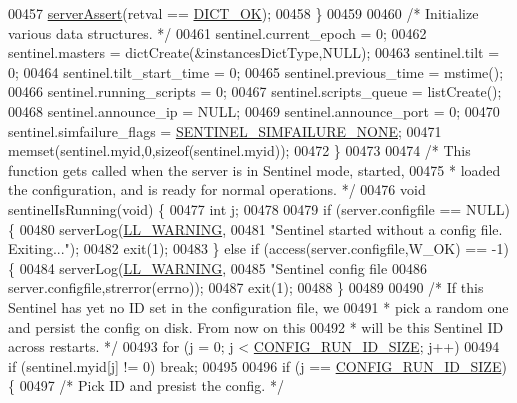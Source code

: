 \begin{DoxyCode}
00457         \hyperlink{server_8h_a88114b5169b4c382df6b56506285e56a}{serverAssert}(retval == \hyperlink{dict_8h_a2afecbeab8f7efbc183048f52f6d17e5}{DICT\_OK});
00458     \}
00459 
00460     \textcolor{comment}{/* Initialize various data structures. */}
00461     sentinel.current\_epoch = 0;
00462     sentinel.masters = dictCreate(&instancesDictType,NULL);
00463     sentinel.tilt = 0;
00464     sentinel.tilt\_start\_time = 0;
00465     sentinel.previous\_time = mstime();
00466     sentinel.running\_scripts = 0;
00467     sentinel.scripts\_queue = listCreate();
00468     sentinel.announce\_ip = NULL;
00469     sentinel.announce\_port = 0;
00470     sentinel.simfailure\_flags = \hyperlink{sentinel_8c_a045e4b70a9044e6e62c9cf6aafff8d3f}{SENTINEL\_SIMFAILURE\_NONE};
00471     memset(sentinel.myid,0,\textcolor{keyword}{sizeof}(sentinel.myid));
00472 \}
00473 
00474 \textcolor{comment}{/* This function gets called when the server is in Sentinel mode, started,}
00475 \textcolor{comment}{ * loaded the configuration, and is ready for normal operations. */}
00476 \textcolor{keywordtype}{void} sentinelIsRunning(\textcolor{keywordtype}{void}) \{
00477     \textcolor{keywordtype}{int} j;
00478 
00479     \textcolor{keywordflow}{if} (server.configfile == NULL) \{
00480         serverLog(\hyperlink{server_8h_a31229b9334bba7d6be2a72970967a14b}{LL\_WARNING},
00481             \textcolor{stringliteral}{"Sentinel started without a config file. Exiting..."});
00482         exit(1);
00483     \} \textcolor{keywordflow}{else} \textcolor{keywordflow}{if} (access(server.configfile,W\_OK) == -1) \{
00484         serverLog(\hyperlink{server_8h_a31229b9334bba7d6be2a72970967a14b}{LL\_WARNING},
00485             \textcolor{stringliteral}{"Sentinel config file %
00486             server.configfile,strerror(errno));
00487         exit(1);
00488     \}
00489 
00490     \textcolor{comment}{/* If this Sentinel has yet no ID set in the configuration file, we}
00491 \textcolor{comment}{     * pick a random one and persist the config on disk. From now on this}
00492 \textcolor{comment}{     * will be this Sentinel ID across restarts. */}
00493     \textcolor{keywordflow}{for} (j = 0; j < \hyperlink{server_8h_aba6794fa3ee28f85165eaed93190f1df}{CONFIG\_RUN\_ID\_SIZE}; j++)
00494         \textcolor{keywordflow}{if} (sentinel.myid[j] != 0) \textcolor{keywordflow}{break};
00495 
00496     \textcolor{keywordflow}{if} (j == \hyperlink{server_8h_aba6794fa3ee28f85165eaed93190f1df}{CONFIG\_RUN\_ID\_SIZE}) \{
00497         \textcolor{comment}{/* Pick ID and presist the config. */}
}
\end{DoxyCode}
